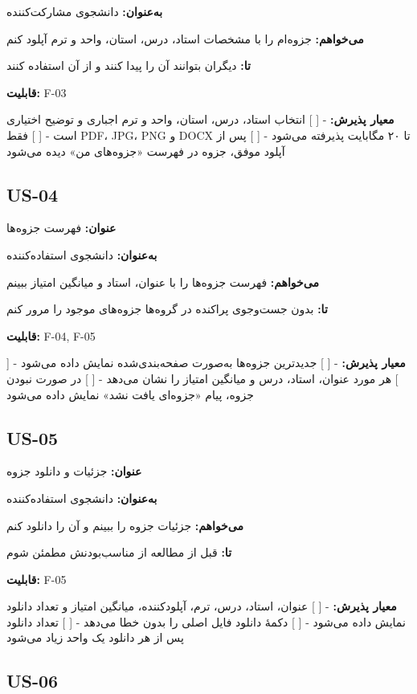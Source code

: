 \documentclass[12pt, a4paper]{article}
\begin{document}
\textbf{به‌عنوان:} دانشجوی مشارکت‌کننده

\textbf{می‌خواهم:} جزوه‌ام را با مشخصات استاد، درس، استان، واحد و ترم آپلود کنم

\textbf{تا:} دیگران بتوانند آن را پیدا کنند و از آن استفاده کنند

\textbf{قابلیت:} F-03

\textbf{معیار پذیرش:}
- {[} {]} انتخاب استاد، درس، استان، واحد و ترم اجباری و توضیح اختیاری است
- {[} {]} فقط PDF، JPG، PNG و DOCX تا ۲۰ مگابایت پذیرفته می‌شود
- {[} {]} پس از آپلود موفق، جزوه در فهرست «جزوه‌های من» دیده می‌شود

\subsection{US-04}

\textbf{عنوان:} فهرست جزوه‌ها

\textbf{به‌عنوان:} دانشجوی استفاده‌کننده

\textbf{می‌خواهم:} فهرست جزوه‌ها را با عنوان، استاد و میانگین امتیاز ببینم

\textbf{تا:} بدون جست‌وجوی پراکنده در گروه‌ها جزوه‌های موجود را مرور کنم

\textbf{قابلیت:} F-04, F-05

\textbf{معیار پذیرش:}
- {[} {]} جدیدترین جزوه‌ها به‌صورت صفحه‌بندی‌شده نمایش داده می‌شود
- {[} {]} هر مورد عنوان، استاد، درس و میانگین امتیاز را نشان می‌دهد
- {[} {]} در صورت نبودن جزوه، پیام «جزوه‌ای یافت نشد» نمایش داده می‌شود

\subsection{US-05}

\textbf{عنوان:} جزئیات و دانلود جزوه

\textbf{به‌عنوان:} دانشجوی استفاده‌کننده

\textbf{می‌خواهم:} جزئیات جزوه را ببینم و آن را دانلود کنم

\textbf{تا:} قبل از مطالعه از مناسب‌بودنش مطمئن شوم

\textbf{قابلیت:} F-05

\textbf{معیار پذیرش:}
- {[} {]} عنوان، استاد، درس، ترم، آپلودکننده، میانگین امتیاز و تعداد دانلود نمایش داده می‌شود
- {[} {]} دکمهٔ دانلود فایل اصلی را بدون خطا می‌دهد
- {[} {]} تعداد دانلود پس از هر دانلود یک واحد زیاد می‌شود

\subsection{US-06}
\end{document}
